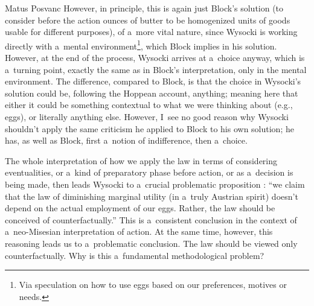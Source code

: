 \begin{artengenv}{Matus Posvanc}
However, in principle, this is again just Block's solution (to consider before the action ounces of butter to be homogenized units of goods usable for different purposes), of a~more vital nature, since Wysocki is working directly with a~mental environment\footnote{Via speculation on how to use eggs based on our preferences, motives or needs.}, which Block implies in his solution. However, at the end of the process, Wysocki arrives at a~choice anyway, which is a~turning point, exactly the same as in Block's interpretation, only in the mental environment. The difference, compared to Block, is that the choice in Wysocki's solution could be, following the Hoppean account, anything; meaning here that either it could be something contextual to what we were thinking about (e.g., eggs), or literally anything else. However, I~see no good reason why Wysocki shouldn't apply the same criticism he applied to Block to his own solution; he has, as well as Block, first a~notion of indifference, then a~choice.



The whole interpretation of how we apply the law in terms of considering eventualities, or a~kind of preparatory phase before action, or as a~decision is being made, then leads Wysocki to a~crucial problematic proposition 
\parencite[][pp.41–42]{Wysocki2021problem}: %
 ``we claim that the law of diminishing marginal utility (in a~truly Austrian spirit) doesn't depend on the actual employment of our eggs. Rather, the law should be conceived of counterfactually.'' This is a~consistent conclusion in the context of a~neo-Misesian interpretation of action. At the same time, however, this reasoning leads us to a~problematic conclusion. The law should be viewed only counterfactually. Why is this a~fundamental methodological problem?




\end{artengenv}
